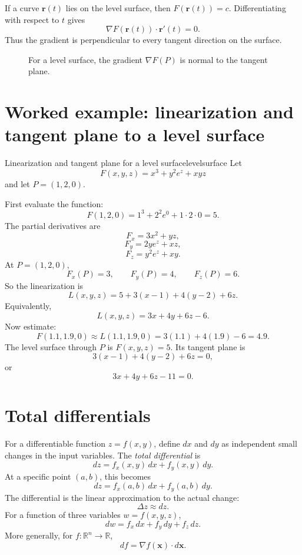 \documentclass[11pt]{article}
\newcommand{\R}{\mathbb R}
\newcommand{\grad}{\nabla}
\begin{document}
If a curve $\mathbf r(t)$ lies on the level surface, then $F(\mathbf r(t))=c$. Differentiating with respect to $t$ gives
\[
\grad F(\mathbf r(t))\cdot \mathbf r'(t)=0.
\]
Thus the gradient is perpendicular to every tangent direction on the surface.

\begin{figure}[H]
\centering
{}
\caption{For a level surface, the gradient $\nabla F(P)$ is normal to the tangent plane.}
\end{figure}

\section{Worked example: linearization and tangent plane to a level surface}

\begin{examplebox}{Linearization and tangent plane for a level surface}{levelsurface}
Let
\[
F(x,y,z)=x^3+y^2e^z+xyz
\]
and let $P=(1,2,0)$.

First evaluate the function:
\[
F(1,2,0)=1^3+2^2e^0+1\cdot 2\cdot 0=5.
\]
The partial derivatives are
\[
F_x=3x^2+yz,
\]
\[
F_y=2ye^z+xz,
\]
\[
F_z=y^2e^z+xy.
\]
At $P=(1,2,0)$,
\[
F_x(P)=3,\qquad F_y(P)=4,\qquad F_z(P)=6.
\]
So the linearization is
\[
L(x,y,z)=5+3(x-1)+4(y-2)+6z.
\]
Equivalently,
\[
L(x,y,z)=3x+4y+6z-6.
\]
Now estimate:
\[
F(1.1,1.9,0)\approx L(1.1,1.9,0)=3(1.1)+4(1.9)-6=4.9.
\]
The level surface through $P$ is $F(x,y,z)=5$. Its tangent plane is
\[
3(x-1)+4(y-2)+6z=0,
\]
or
\[
3x+4y+6z-11=0.
\]
\end{examplebox}

\section{Total differentials}

For a differentiable function $z=f(x,y)$, define $dx$ and $dy$ as independent small changes in the input variables. The \emph{total differential} is
\[
dz=f_x(x,y)\,dx+f_y(x,y)\,dy.
\]
At a specific point $(a,b)$, this becomes
\[
dz=f_x(a,b)\,dx+f_y(a,b)\,dy.
\]
The differential is the linear approximation to the actual change:
\[
\Delta z\approx dz.
\]
For a function of three variables $w=f(x,y,z)$,
\[
dw=f_x\,dx+f_y\,dy+f_z\,dz.
\]
More generally, for $f:\R^n\to\R$,
\[
df=\grad f(\mathbf{x})\cdot d\mathbf{x}.
\]
\end{document}
